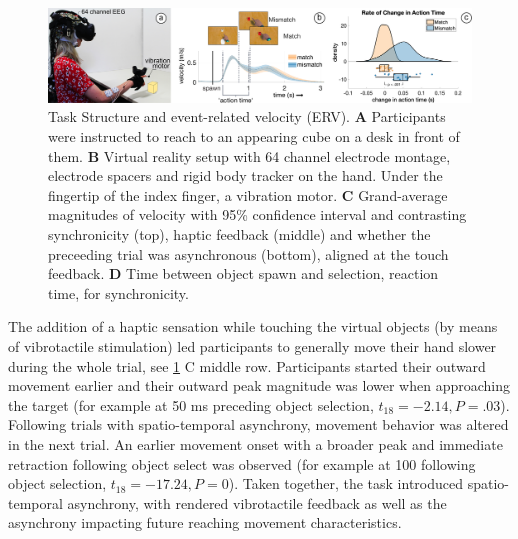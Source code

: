 \begin{figure}[t]
  \includegraphics[width=\textwidth]{figures/task_behavior.pdf}
  \caption{Task Structure and event-related velocity (ERV). \textbf{A} Participants were instructed to reach to an appearing cube on a desk in front of them. \textbf{B} Virtual reality setup with 64 channel electrode montage, electrode spacers and rigid body tracker on the hand. Under the fingertip of the index finger, a vibration motor. \textbf{C} Grand-average magnitudes of velocity with 95\% confidence interval and contrasting synchronicity (top), haptic feedback (middle) and whether the preceeding trial was asynchronous (bottom), aligned at the touch feedback. \textbf{D} Time between object spawn and selection, reaction time, for synchronicity.}
  \label{setup_and_behavior}
\end{figure}

The addition of a haptic sensation while touching the virtual objects (by means of vibrotactile stimulation) led participants to generally move their hand slower during the whole trial, see \ref{setup_and_behavior} C middle row. Participants started their outward movement earlier and their outward peak magnitude was lower when approaching the target (for example at 50 ms preceding object selection, $t_{18} = -2.14, P = .03$). Following trials with spatio-temporal asynchrony, movement behavior was altered in the next trial. An earlier movement onset with a broader peak and immediate retraction following object select was observed (for example at 100 following object selection, $t_{18} = -17.24, P = 0$). Taken together, the task introduced spatio-temporal asynchrony, with rendered vibrotactile feedback as well as the asynchrony impacting future reaching movement characteristics.